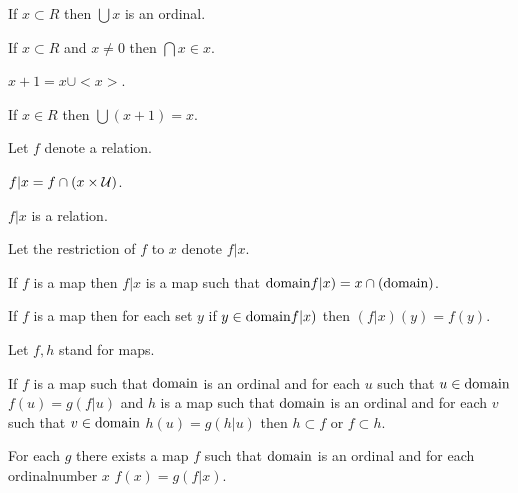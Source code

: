 \documentclass[a4paper,draft]{amsproc}
\begin{document}
\begin{forthel}
\begin{theorem}[120]
If $x \subset R$ then $\bigcup x$ is an ordinal.
\end{theorem}

\begin{theorem}[121]
If $x \subset R$ and $x \neq 0$ then $\bigcap x \in x$.
\end{theorem}

\begin{definition}[122]
$x + 1 = x \cup <x>$.
\end{definition}


\begin{theorem}[124]
If $x \in R$ then $\bigcup (x + 1) = x$.
\end{theorem}

Let $f$ denote a relation.
\begin{definition}
$f | x = f \cap (x \times \cal{U})$.
\end{definition}

\begin{lemma}
$f | x$ is a relation.
\end{lemma}

Let the restriction of $f$ to $x$ denote $f | x$.

\begin{theorem}[126a]
If $f$ is a map then $f | x$ is a map such that $\domain (f | x) = x \cap (\domain f)$.
\end{theorem}

\begin{theorem}[126b]
If $f$ is a map then for each set $y$ if $y \in \domain (f | x)$ then $(f | x)(y) = f(y)$.
\end{theorem}

Let $f, h$ stand for maps.
\begin{theorem}[127]
If $f$ is a map such that $\domain f$ is an ordinal and for each $u$ such that $u \in \domain f$ $f(u) = g(f | u)$
and $h$ is a map such that $\domain h$ is an ordinal and for each $v$ such that $v \in \domain h$ $h(u) = g(h | u)$
then $h \subset f$ or $f \subset h$.
\end{theorem}

\begin{theorem}[128]
For each $g$ there exists a %
map $f$ such that $\domain f$ is an ordinal
and for each ordinalnumber $x$ $f(x) = g(f | x)$.
\end{theorem}

\end{forthel}
\end{document}
